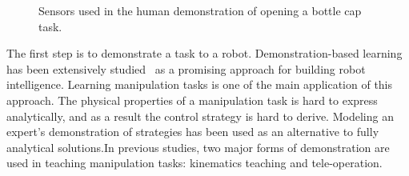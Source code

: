 \begin{figure}
  \centering
    \caption{  {Sensors used in the human demonstration of opening a bottle cap task.}}
  \label{fig:devices}
\end{figure}


The first step is to demonstrate a task to a robot. Demonstration-based learning has been extensively studied~\citep{calinon2007learning,dillmann2004teaching,kulic2012incremental}
as a promising approach for building robot
intelligence. %
Learning manipulation tasks is one of the main application of this
approach. The physical properties of a manipulation task is hard to
express analytically, and as a result the control strategy is hard to derive. Modeling an expert's demonstration
of strategies has been used as an alternative to fully analytical
solutions.In previous studies, two major forms of demonstration are used in teaching manipulation tasks: kinematics teaching and tele-operation.

